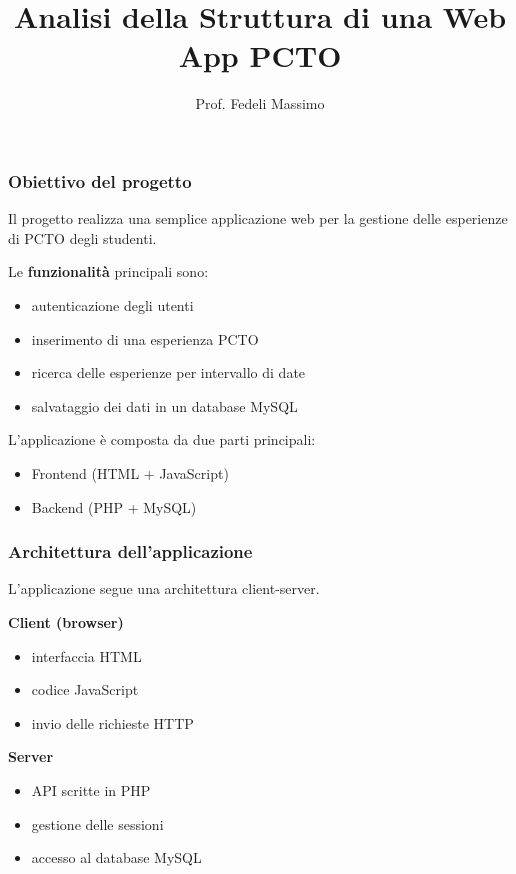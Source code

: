 \documentclass{beamer}
\title{Analisi della Struttura di una Web App PCTO}
\author{Prof. Fedeli Massimo}
\date{}
\begin{document}
	
	\frame{\titlepage}
	
	
	\begin{frame}
		\frametitle{Obiettivo del progetto}
		
		Il progetto realizza una semplice applicazione web per la gestione
		delle esperienze di PCTO degli studenti.
		
		Le \textbf{funzionalità} principali sono:
		
		\begin{itemize}
			\item autenticazione degli utenti
			\item inserimento di una esperienza PCTO
			\item ricerca delle esperienze per intervallo di date
			\item salvataggio dei dati in un database MySQL
		\end{itemize}
		
		L'applicazione è composta da due parti principali:
		
		\begin{itemize}
			\item Frontend (HTML + JavaScript)
			\item Backend (PHP + MySQL)
		\end{itemize}
		
	\end{frame}
	
	
	\begin{frame}
		\frametitle{Architettura dell'applicazione}
		
		L'applicazione segue una architettura client-server.
		
		\bigskip
		
		\textbf{Client (browser)}
		
		\begin{itemize}
			\item interfaccia HTML
			\item codice JavaScript
			\item invio delle richieste HTTP
		\end{itemize}
		
		\bigskip
		
		\textbf{Server}
		
		\begin{itemize}
			\item API scritte in PHP
			\item gestione delle sessioni
			\item accesso al database MySQL
		\end{itemize}
		
	\end{frame}
	
\end{document}
